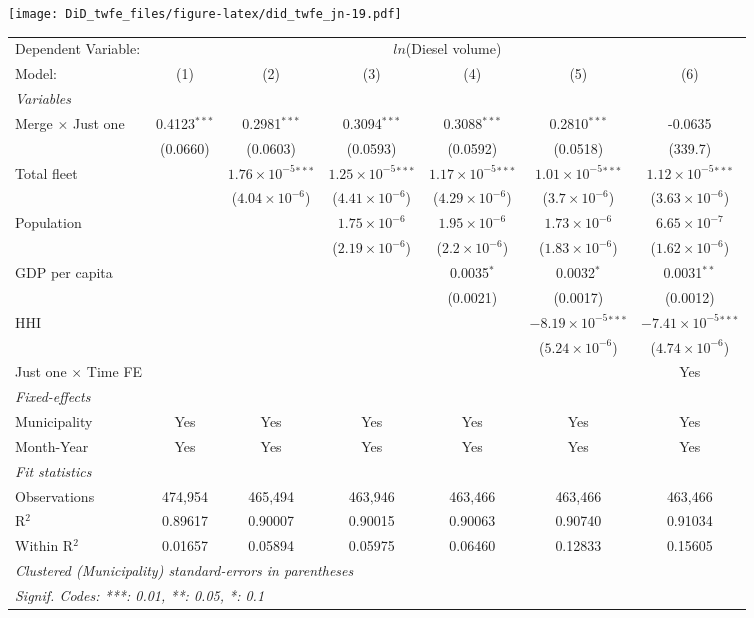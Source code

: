 \documentclass[
]{article}
\begin{document}
\texttt{[image: DiD\_twfe\_files/figure-latex/did\_twfe\_jn-19.pdf]}

\begin{tabular}{lcccccc}
\tabularnewline\midrule\midrule
Dependent Variable:&\multicolumn{6}{c}{$ln$(Diesel volume)}\\
Model:&(1) & (2) & (3) & (4) & (5) & (6)\\
\midrule \emph{Variables}&   &   &   &   &   &  \\
Merge $\times $ Just one & 0.4123$^{***}$ & 0.2981$^{***}$ & 0.3094$^{***}$ & 0.3088$^{***}$ & 0.2810$^{***}$ & -0.0635\\
  &(0.0660) & (0.0603) & (0.0593) & (0.0592) & (0.0518) & (339.7)\\
Total fleet &    & $1.76\times 10^{-5}$$^{***}$ & $1.25\times 10^{-5}$$^{***}$ & $1.17\times 10^{-5}$$^{***}$ & $1.01\times 10^{-5}$$^{***}$ & $1.12\times 10^{-5}$$^{***}$\\
  &   & ($4.04\times 10^{-6}$) & ($4.41\times 10^{-6}$) & ($4.29\times 10^{-6}$) & ($3.7\times 10^{-6}$) & ($3.63\times 10^{-6}$)\\
Population &    &    & $1.75\times 10^{-6}$ & $1.95\times 10^{-6}$ & $1.73\times 10^{-6}$ & $6.65\times 10^{-7}$\\
  &   &    & ($2.19\times 10^{-6}$) & ($2.2\times 10^{-6}$) & ($1.83\times 10^{-6}$) & ($1.62\times 10^{-6}$)\\
GDP per capita &    &    &    & 0.0035$^{*}$ & 0.0032$^{*}$ & 0.0031$^{**}$\\
  &   &    &    & (0.0021) & (0.0017) & (0.0012)\\
HHI &    &    &    &    & $-8.19\times 10^{-5}$$^{***}$ & $-7.41\times 10^{-5}$$^{***}$\\
  &   &    &    &    & ($5.24\times 10^{-6}$) & ($4.74\times 10^{-6}$)\\
Just one $\times$ Time FE &  &  &  &  &  & Yes\\
\midrule \emph{Fixed-effects}&   &   &   &   &   &  \\
Municipality & Yes & Yes & Yes & Yes & Yes & Yes\\
Month-Year & Yes & Yes & Yes & Yes & Yes & Yes\\
\midrule \emph{Fit statistics}&  & & & & & \\
Observations & 474,954&465,494&463,946&463,466&463,466&463,466\\
R$^2$ & 0.89617&0.90007&0.90015&0.90063&0.90740&0.91034\\
Within R$^2$ & 0.01657&0.05894&0.05975&0.06460&0.12833&0.15605\\
\midrule\midrule\multicolumn{7}{l}{\emph{Clustered (Municipality) standard-errors in parentheses}}\\
\multicolumn{7}{l}{\emph{Signif. Codes: ***: 0.01, **: 0.05, *: 0.1}}\\
\end{tabular}
\end{document}
